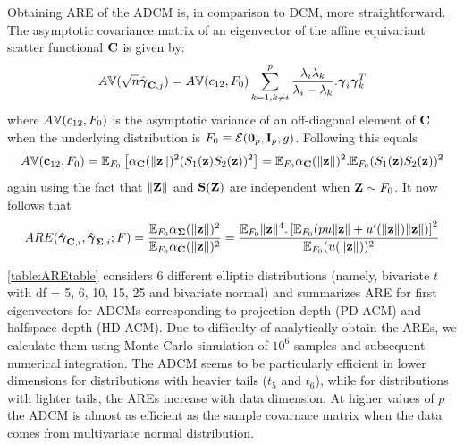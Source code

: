 Obtaining ARE of the ADCM is, in comparison to DCM, more straightforward. The asymptotic covariance matrix of an eigenvector of the affine equivariant scatter functional ${\mathbf{C}}$ is given by:
%
$$
A{\mathbb{V}}(\sqrt n  \hat{{\boldsymbol{\gamma}}}_{{\mathbf{C}},j}) = A{\mathbb{V}}(c_{12}, F_0) \sum_{k=1, k \neq i}^p \frac{\lambda_i \lambda_k}{\lambda_i - \lambda_k}. {\boldsymbol{\gamma}}_i {\boldsymbol{\gamma}}_k^T
$$
%
where $A{\mathbb{V}}(c_{12}, F_0)$ is the asymptotic variance of an off-diagonal element of ${\mathbf{C}}$ when the underlying distribution is $F_0 \equiv {\cal{E}} ({\bf 0}_p, {\mathbf{I}}_p, g)$. Following \cite{croux00} this equals
%
$$
A{\mathbb{V}}({\bf{c}}_{12}, F_0) = {\mathbb{E}}_{F_0} \left[ \alpha_{\mathbf{C}} (\| {\bf{z}} \|)^2 (S_1({\bf{z}})S_2 ({\bf{z}}))^2 \right] = {\mathbb{E}}_{F_0} \alpha_{\mathbf{C}} (\| {\bf{z}} \|)^2 . {\mathbb{E}}_{F_0} (S_1({\bf{z}})S_2 ({\bf{z}}))^2 
$$
% 
again using the fact that $\|{\mathbf{Z}}\|$ and ${\mathbf{S}}({\mathbf{Z}})$ are independent when ${\mathbf{Z}} \sim F_0$. It now follows that
%
\begin{equation}
ARE (\hat{{\boldsymbol{\gamma}}}_{{\mathbf{C}},i}, \hat{{\boldsymbol{\gamma}}}_{ {\boldsymbol{\Sigma}},i}; F) = \frac{{\mathbb{E}}_{F_0} \alpha_{{\boldsymbol{\Sigma}}} (\| {\bf{z}} \|)^2}{{\mathbb{E}}_{F_0} \alpha_{\mathbf{C}} (\| {\bf{z}} \|)^2} = \frac{{\mathbb{E}}_{F_0} \| {\bf{z}} \|^4. \left[ {\mathbb{E}}_{F_0} ( p u \| {\bf{z}}\| + u'( \| {\bf{z}} \|) \| {\bf{z}} \| ) \right]^2}{{\mathbb{E}}_{F_0} (u(\| {\bf{z}} \|))^2}
\end{equation}
%

\ref{table:AREtable} considers 6 different elliptic distributions (namely, bivariate $t$ with df = 5, 6, 10, 15, 25 and bivariate normal) and summarizes ARE for first eigenvectors for ADCMs corresponding to projection depth (PD-ACM) and halfspace depth (HD-ACM). Due to difficulty of analytically obtain the AREs, we calculate them using Monte-Carlo simulation of $10^6$ samples and subsequent numerical integration. The ADCM seems to be particularly efficient in lower dimensions for distributions with heavier tails ($t_5$ and $t_6$), while for distributions with lighter tails, the AREs increase with data dimension. At higher values of $p$ the ADCM is almost as efficient as the sample covarnace matrix when the data comes from multivariate normal distribution.

